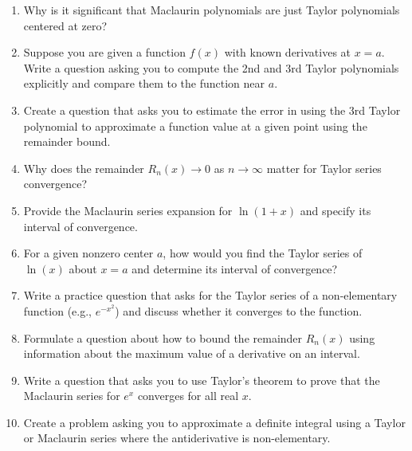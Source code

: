 \begin{enumerate}
  \item Why is it significant that Maclaurin polynomials are just Taylor polynomials centered at zero?
  \item Suppose you are given a function \(f(x)\) with known derivatives at \(x=a\). Write a question asking you to compute the 2nd and 3rd Taylor polynomials explicitly and compare them to the function near \(a\).
  \item Create a question that asks you to estimate the error in using the 3rd Taylor polynomial to approximate a function value at a given point using the remainder bound.
  \item Why does the remainder \(R_n(x)\to 0\) as \(n\to\infty\) matter for Taylor series convergence?
  \item Provide the Maclaurin series expansion for \(\ln(1+x)\) and specify its interval of convergence.
  \item For a given nonzero center \(a\), how would you find the Taylor series of \(\ln(x)\) about \(x=a\) and determine its interval of convergence?
  \item Write a practice question that asks for the Taylor series of a non-elementary function (e.g., \(e^{-x^2}\)) and discuss whether it converges to the function.
  \item Formulate a question about how to bound the remainder \(R_n(x)\) using information about the maximum value of a derivative on an interval.
  \item Write a question that asks you to use Taylor's theorem to prove that the Maclaurin series for \(e^x\) converges for all real \(x\).
  \item Create a problem asking you to approximate a definite integral using a Taylor or Maclaurin series where the antiderivative is non-elementary.
\end{enumerate}
